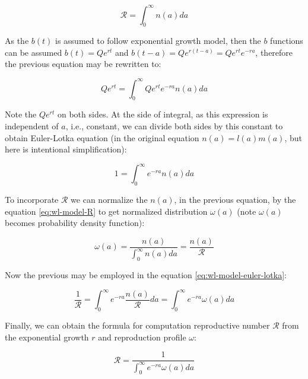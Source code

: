\documentclass[
  digital, %
  oneside, %
  lof,     %
  lot,     %
]{fithesis4}
\begin{document}
\begin{equation}\label{eq:wl-model-R}
  \mathcal{R} = \int_0^{\infty} n(a) da
\end{equation}

As the $b(t)$ is assumed to follow exponential growth model, then 
the $b$ functions can be assumed $b(t) = Q e^{rt}$ and 
$b(t - a) = Q e^{r(t - a)} = Q e^{rt} e^{-ra}$, therefore the
previous equation may be rewritten to:

\begin{equation}
  Q e^{rt} = \int_{0}^{\infty} Q e^{rt} e^{-ra} n(a) da
\end{equation}

Note the $Q e^{rt}$ on both sides. At the side of integral, 
as this expression is independent of $a$, i.e., constant, we can 
divide both sides by this constant to obtain Euler-Lotka
equation (in the original equation $n(a) = l(a) m(a)$, but 
here is intentional simplification):

\begin{equation}\label{eq:wl-model-euler-lotka}
  1 = \int_{0}^{\infty} e^{-ra} n(a) da
\end{equation}

To incorporate $\mathcal{R}$ we can normalize the $n(a)$, in the
previous equation, by the equation \eqref{eq:wl-model-R} to get
normalized distribution $\omega(a)$ (note $\omega(a)$ becomes 
probability density function):

\begin{equation}
  \omega(a) = \frac{n(a)}{\int_0^{\infty} n(a) da} = \frac{n(a)}{\mathcal{R}}
\end{equation}

Now the previous may be employed in the equation \eqref{eq:wl-model-euler-lotka}:

\begin{equation}\label{eq:wl-model-euler-lotka-R}
  \frac{1}{\mathcal{R}} = \int_{0}^{\infty} e^{-ra} \frac{n(a)}{\mathcal{R}} da = \int_{0}^{\infty} e^{-ra} \omega(a) da
\end{equation}

Finally, we can obtain the formula for computation reproductive number
$\mathcal{R}$ from the exponential growth $r$ and reproduction profile $\omega$:

\begin{equation}\label{eq:wl-model-euler-lotka-R-final}
  \mathcal{R} = \frac{1}{\int_{0}^{\infty} e^{-ra} \omega(a) da}
\end{equation}
\end{document}
